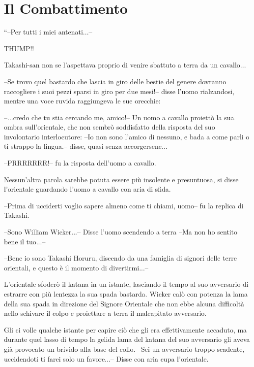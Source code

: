 \iffullversion \onecolumn\fi
\chapter{Il Combattimento}
\label{combattimento}
\newcommand{\persA} {\textbf{A}rt}
\newcommand{\persB} {\textbf{B}art}
\newcommand{\persC} {\textbf{C}art}
\newcommand{\persD} {\textbf{D}art}

\iffullversion
\vfill
\begin{racconto}
  ``--Per tutti i miei antenati...--
  
  THUMP!!
  
  Takashi-san non se l'aspettava proprio di venire sbattuto a terra da
  un cavallo... 
  
  --Se trovo quel bastardo che lascia in giro delle
  bestie del genere dovranno raccogliere i suoi pezzi sparsi in giro
  per due mesi!-- disse l'uomo rialzandosi, mentre una voce ruvida
  raggiungeva le sue orecchie:
  
  --...credo che tu stia cercando me, amico!-- Un uomo a cavallo
  proiett\`o la sua ombra sull'orientale, che non sembr\`o
  soddisfatto della risposta del suo involontario interlocutore: --Io
  non sono l'amico di nessuno, e bada a come parli o ti strappo la
  lingua.-- disse, quasi senza accorgersene...
  
  --PRRRRRRR!-- fu la risposta dell'uomo a cavallo.
  
  Nessun'altra parola sarebbe potuta essere pi\`u insolente e
  presuntuosa, si disse l'orientale guardando l'uomo a cavallo con
  aria di sfida.
  
  --Prima di ucciderti voglio sapere almeno come ti chiami, uomo-- fu la
  replica di Takashi.
  
  --Sono William Wicker...-- Disse l'uomo scendendo a terra --Ma non
  ho sentito bene il tuo...--
  
  --Bene io sono Takashi Horuru, discendo da una famiglia di signori
  delle terre orientali, e questo \`e il momento di divertirmi...--
  
  L'orientale sfoder\`o il katana in un istante, lasciando il tempo
  al suo avversario di estrarre con pi\`u lentezza la sua spada
  bastarda. Wicker cal\`o con potenza la lama della sua spada in
  direzione del Signore Orientale che non ebbe alcuna difficolt\`a
  nello schivare il colpo e proiettare a terra il malcapitato
  avversario.
  
  Gli ci volle qualche istante per capire ci\`o che gli era
  effettivamente accaduto, ma durante quel lasso di tempo la gelida
  lama del katana del suo avversario gli aveva gi\`a provocato un
  brivido alla base del collo. --Sei un avversario troppo scadente,
  uccidendoti ti farei solo un favore...-- Disse con aria cupa
  l'orientale.
  

\end{racconto}
